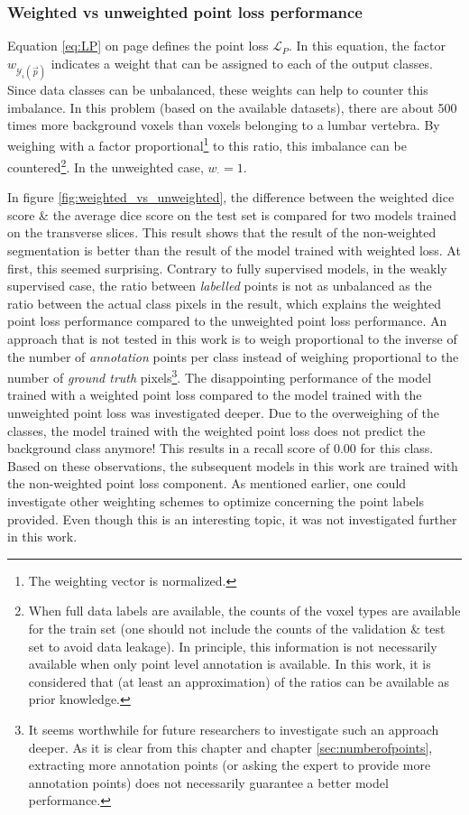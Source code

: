 \subsubsection{Weighted vs unweighted point loss performance}
\par{
    Equation \ref{eq:LP} on page \pageref{eq:LP} defines the point loss $\mathcal{L}_P$. 
    In this equation, the factor $w_{\mathcal{Y}_i(\vec{p})}$ indicates a weight that can be assigned to each of the output classes.
    Since data classes can be unbalanced, these weights can help to counter this imbalance.
    In this problem (based on the available datasets), there are about 500 times more background voxels than voxels belonging to a lumbar vertebra.
    By weighing with a factor proportional\footnote{The weighting vector is normalized.} to this ratio, this imbalance can be countered\footnote{
        When full data labels are available, the counts of the voxel types are available for the train set (one should not include the counts of the validation \& test set to avoid data leakage).
        In principle, this information is not necessarily available when only point level annotation is available. In this work, it is considered that (at least an approximation) of the ratios can be available as prior knowledge.
    }. In the unweighted case, $w_{\cdot} = 1$.
}
\par{
    In figure \ref{fig:weighted_vs_unweighted}, the difference between the weighted dice score \& the average dice score on the test set is compared for two models trained on the transverse slices.
    This result shows that the result of the non-weighted segmentation is better than the result of the model trained with weighted loss.
    At first, this seemed surprising.
    Contrary to fully supervised models, in the weakly supervised case, the ratio between \textit{labelled} points is not as unbalanced as the ratio between the actual class pixels in the result, which explains the weighted point loss performance compared to the unweighted point loss performance.
    An approach that is not tested in this work is to weigh proportional to the inverse of the number of \textit{annotation} points per class instead of weighing proportional to the number of \textit{ground truth} pixels\footnote{
        It seems worthwhile for future researchers to investigate such an approach deeper. 
        As it is clear from this chapter and chapter \ref{sec:numberofpoints}, extracting more annotation points (or asking the expert to provide more annotation points) does not necessarily guarantee a better model performance.
    }.
    The disappointing performance of the model trained with a weighted point loss compared to the model trained with the unweighted point loss was investigated deeper.
    Due to the overweighing of the classes, the model trained with the weighted point loss does not predict the background class anymore! 
    This results in a recall score of 0.00 for this class.
    Based on these observations, the subsequent models in this work are trained with the non-weighted point loss component.
    As mentioned earlier, one could investigate other weighting schemes to optimize concerning the point labels provided.
    Even though this is an interesting topic, it was not investigated further in this work.
}
